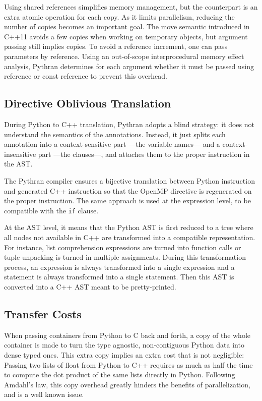 \documentclass{llncs}
\begin{document}
Using shared references simplifies memory management, but the counterpart is an
extra atomic operation for each copy. As it limits parallelism, reducing the
number of copies becomes an important goal. The move semantic introduced in
C++11 avoids a few copies when working on temporary objects, but argument
passing still implies copies. To avoid a reference increment, one can pass
parameters by reference. Using an out-of-scope interprocedural memory effect
analysis, Pythran determines for each argument whether it must be passed using
reference or const reference to prevent this overhead.

\subsection{Directive Oblivious Translation}

During Python to C++ translation, Pythran adopts a blind strategy: it does not
understand the semantics of the annotations. Instead, it just splits each
annotation into a context-sensitive part ---the variable names--- and a
context-insensitive part ---the clauses---, and attaches them to the proper
instruction in the AST.

The Pythran compiler ensures a bijective translation between Python instruction
and generated C++ instruction so that the OpenMP directive is regenerated on the
proper instruction. The same approach is used at the expression level, to be
compatible with the \texttt{if} clause.

At the AST level, it means that the Python AST is first reduced to a tree where
all nodes not available in C++ are transformed into a compatible representation.
For instance, list comprehension expressions are turned into function calls or
tuple unpacking is turned in multiple assignments. During this transformation
process, an expression is always transformed into a single expression and a
statement is always transformed into a single statement. Then this AST is
converted into a C++ AST meant to be pretty-printed.


\subsection{Transfer Costs}

When passing containers from Python to C back and forth, a copy of the whole
container is made to turn the type agnostic, non-contiguous Python data into
dense typed ones. This extra copy implies an extra cost that is not negligible:
Passing two lists of float from Python to C++ requires as much as half the time
to compute the dot product of the same lists directly in Python. Following
Amdahl's law, this copy overhead greatly hinders the benefits of
parallelization, and is a well known issue.
\end{document}
